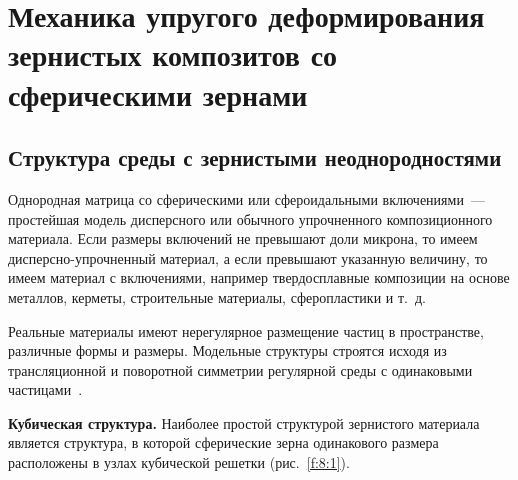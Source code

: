 
\chapter{Механика упругого деформирования зернистых композитов со сферическими зернами}


\section{Структура среды с зернистыми неоднородностями}

Однородная матрица со сферическими или сфероидальными включениями~--- простейшая модель дисперсного или обычного упрочненного композиционного материала. Если размеры включений не превышают доли микрона, то имеем дисперсно-упрочненный материал, а если превышают указанную величину, то имеем материал с включениями, например твердосплавные композиции на основе металлов, керметы, строительные материалы, сферопластики и т.~д.

Реальные материалы имеют нерегулярное размещение частиц в пространстве, различные формы и размеры. Модельные структуры строятся исходя из трансляционной и поворотной симметрии регулярной среды с одинаковыми частицами~\cite{Vanin1985}.

\textbf{Кубическая структура.} Наиболее простой структурой зернистого материала является структура, в которой сферические зерна одинакового размера расположены в узлах кубической решетки (рис.~\ref{f:8:1}).{\sloppy\par}

